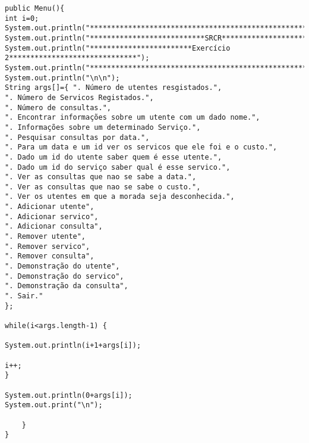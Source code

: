 \documentclass[pdftex,12pt,a4paper]{report}
\begin{document}
\begin{appendices}
\begin{verbatim}
public Menu(){
int i=0;
System.out.println("*****************************************************************");
System.out.println("***************************SRCR**********************************");
System.out.println("************************Exercício 2******************************");
System.out.println("*****************************************************************");
System.out.println("\n\n");
String args[]={ ". Número de utentes resgistados.",
". Número de Servicos Registados.",
". Número de consultas.",
". Encontrar informações sobre um utente com um dado nome.",
". Informações sobre um determinado Serviço.",
". Pesquisar consultas por data.",
". Para um data e um id ver os servicos que ele foi e o custo.",
". Dado um id do utente saber quem é esse utente.",
". Dado um id do serviço saber qual é esse servico.",
". Ver as consultas que nao se sabe a data.",
". Ver as consultas que nao se sabe o custo.",
". Ver os utentes em que a morada seja desconhecida.",
". Adicionar utente",
". Adicionar servico",
". Adicionar consulta",
". Remover utente",
". Remover servico",
". Remover consulta",
". Demonstração do utente",
". Demonstração do servico",
". Demonstração da consulta",
". Sair."
};

while(i<args.length-1) {

System.out.println(i+1+args[i]);

i++;
}

System.out.println(0+args[i]);
System.out.print("\n");

	}
}
\end{verbatim}


\end{appendices}
\end{document}
